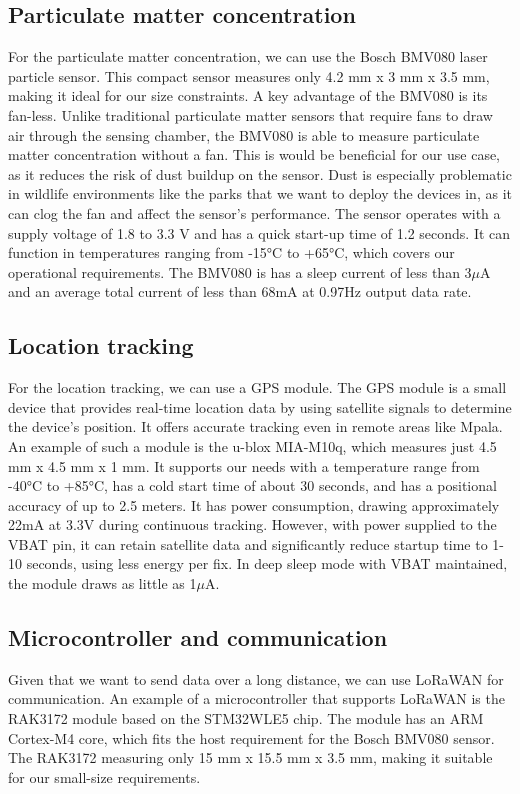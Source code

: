 \subsection{Particulate matter concentration}
For the particulate matter concentration, we can use the Bosch BMV080 laser particle sensor\cite{bmv080}. This compact sensor measures only 4.2 mm x 3 mm x 3.5 mm, making it ideal for our size constraints. A key advantage of the BMV080 is its fan-less. Unlike traditional particulate matter sensors that require fans to draw air through the sensing chamber, the BMV080 is able to measure particulate matter concentration without a fan. This is would be beneficial for our use case, as it reduces the risk of dust buildup on the sensor. Dust is especially problematic in wildlife environments like the parks that we want to deploy the devices in, as it can clog the fan and affect the sensor's performance. The sensor operates with a supply voltage of 1.8 to 3.3 V and has a quick start-up time of 1.2 seconds. It can function in temperatures ranging from -15°C to +65°C, which covers our operational requirements. The BMV080 is has a sleep current of less than 3$\mu$A and an average total current of less than 68mA at 0.97Hz output data rate.


\subsection{Location tracking}
For the location tracking, we can use a GPS module. The GPS module is a small device that provides real-time location data by using satellite signals to determine the device's position. It offers accurate tracking even in remote areas like Mpala. An example of such a module is the u-blox MIA-M10q, which measures just 4.5 mm x 4.5 mm x 1 mm\cite{u_blox_mia_m10q}. It supports our needs with a temperature range from -40°C to +85°C, has a cold start time of about 30 seconds, and has a positional accuracy of up to 2.5 meters. It has power consumption, drawing approximately 22mA at 3.3V during continuous tracking. However, with power supplied to the VBAT pin, it can retain satellite data and significantly reduce startup time to 1-10 seconds, using less energy per fix. In deep sleep mode with VBAT maintained, the module draws as little as 1$\mu$A.

\subsection{Microcontroller and communication}
Given that we want to send data over a long distance, we can use LoRaWAN for communication. An example of a microcontroller that supports LoRaWAN is the RAK3172 module based on the STM32WLE5 chip\cite{rak3172_datasheet}. The module has an ARM Cortex-M4 core, which fits the host requirement for the Bosch BMV080 sensor. The RAK3172 measuring only 15 mm x 15.5 mm x 3.5 mm, making it suitable for our small-size requirements.

